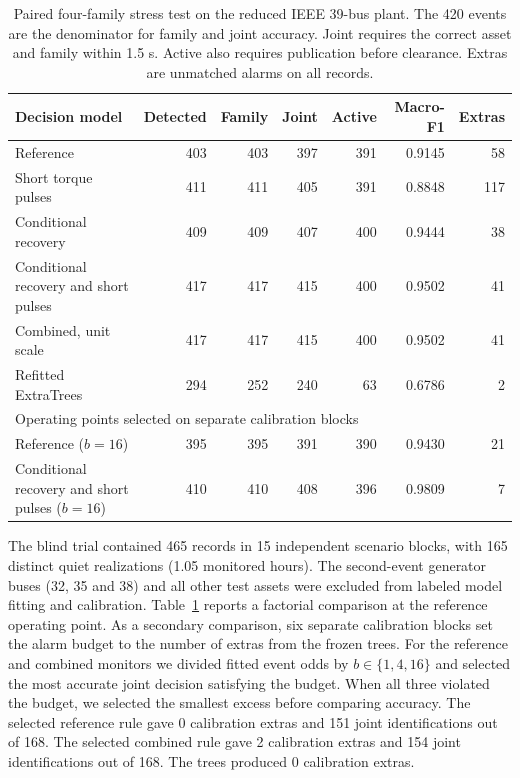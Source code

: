 \begin{table}[t]\centering\footnotesize
\caption{Paired four-family stress test on the reduced IEEE 39-bus plant. The 420 events are the denominator for family and joint accuracy. Joint requires the correct asset and family within 1.5 s. Active also requires publication before clearance. Extras are unmatched alarms on all records.}
\label{tab:four-family-conditional}\setlength{\tabcolsep}{5pt}
\begin{tabular}{lrrrrrr}\toprule
Decision model & Detected & Family & Joint & Active & Macro-F1 & Extras\\\midrule
Reference & 403 & 403 & 397 & 391 & 0.9145 & 58 \\
Short torque pulses & 411 & 411 & 405 & 391 & 0.8848 & 117 \\
Conditional recovery & 409 & 409 & 407 & 400 & 0.9444 & 38 \\
Conditional recovery and short pulses & 417 & 417 & 415 & 400 & 0.9502 & 41 \\
Combined, unit scale & 417 & 417 & 415 & 400 & 0.9502 & 41 \\
Refitted ExtraTrees & 294 & 252 & 240 & 63 & 0.6786 & 2 \\
\midrule\multicolumn{7}{l}{Operating points selected on separate calibration blocks}\\
Reference ($b=16$) & 395 & 395 & 391 & 390 & 0.9430 & 21 \\
Conditional recovery and short pulses ($b=16$) & 410 & 410 & 408 & 396 & 0.9809 & 7 \\
\bottomrule\end{tabular}\end{table}

The blind trial contained 465 records in 15 independent scenario blocks,
with 165 distinct quiet realizations (1.05 monitored hours).
The second-event generator buses (32, 35 and 38) and all other test assets were excluded from labeled model fitting and calibration.
Table~\ref{tab:four-family-conditional} reports a factorial comparison at the reference operating point.
As a secondary comparison, six separate calibration blocks set the alarm budget to the number of extras from the frozen trees.
For the reference and combined monitors we divided fitted event odds by $b\in\{1,4,16\}$ and selected the most accurate joint decision satisfying the budget.
When all three violated the budget, we selected the smallest excess before comparing accuracy.
The selected reference rule gave 0 calibration extras and 151 joint identifications out of 168.
The selected combined rule gave 2 calibration extras and 154 joint identifications out of 168.
The trees produced 0 calibration extras.

